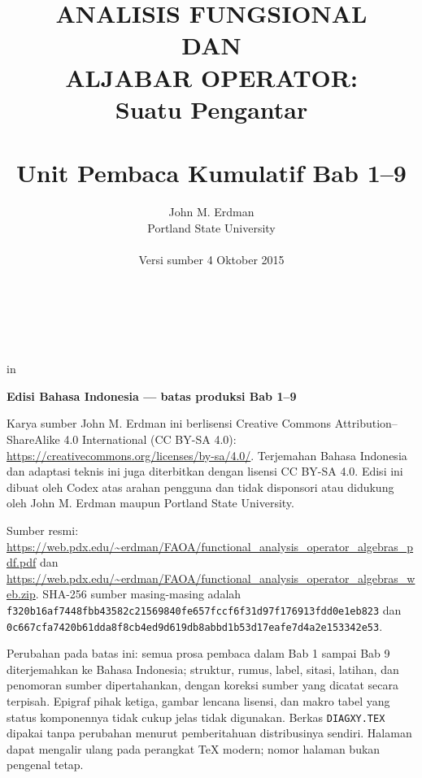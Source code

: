 \documentclass[11pt,reqno]{amsbook}
\theoremstyle{definition}
\theoremstyle{remark}
\numberwithin{equation}{section}
\begin{document}
 \frontmatter
 \title{ANALISIS FUNGSIONAL \\ DAN \\ ALJABAR OPERATOR: \\ Suatu Pengantar \\ \mbox{} \\ \large Unit Pembaca Kumulatif Bab 1--9}
 \author{John M. Erdman \\
      Portland State University \\
      \mbox{\hphantom{P}} \\
      Versi sumber 4 Oktober 2015 \\
      \mbox{\hphantom{P}} \\
      \mbox{\hphantom{P}} \\
            \mbox{\hphantom{P}} \\
                  \mbox{\hphantom{P}} }


 in


\maketitle


\begin{center}
\textbf{Edisi Bahasa Indonesia --- batas produksi Bab 1--9}
\end{center}

Karya sumber John M. Erdman ini berlisensi Creative Commons
Attribution--ShareAlike 4.0 International (CC BY-SA 4.0):
\url{https://creativecommons.org/licenses/by-sa/4.0/}.
Terjemahan Bahasa Indonesia dan adaptasi teknis ini juga diterbitkan dengan
lisensi CC BY-SA 4.0. Edisi ini dibuat oleh Codex atas arahan pengguna dan tidak
disponsori atau didukung oleh John M. Erdman maupun Portland State University.

\begin{sloppypar}
Sumber resmi:
\url{https://web.pdx.edu/~erdman/FAOA/functional_analysis_operator_algebras_pdf.pdf}
dan
\url{https://web.pdx.edu/~erdman/FAOA/functional_analysis_operator_algebras_web.zip}.
SHA-256 sumber masing-masing adalah
\texttt{f320b16af7448fbb43582c21569840fe\allowbreak657fccf6f31d97f176913fdd0e1eb823}
dan
\texttt{0c667cfa7420b61dda8f8cb4ed9d619d\allowbreak b8abbd1b53d17eafe7d4a2e153342e53}.
\end{sloppypar}

Perubahan pada batas ini: semua prosa pembaca dalam Bab 1 sampai Bab 9
diterjemahkan ke Bahasa Indonesia; struktur, rumus, label, sitasi, latihan,
dan penomoran sumber dipertahankan, dengan koreksi sumber yang dicatat secara
terpisah. Epigraf pihak ketiga, gambar lencana lisensi, dan makro tabel yang
status komponennya tidak cukup jelas tidak digunakan. Berkas
\texttt{DIAGXY.TEX} dipakai tanpa perubahan menurut pemberitahuan distribusinya
sendiri. Halaman dapat
mengalir ulang pada perangkat TeX modern; nomor halaman bukan pengenal tetap.
\end{document}
